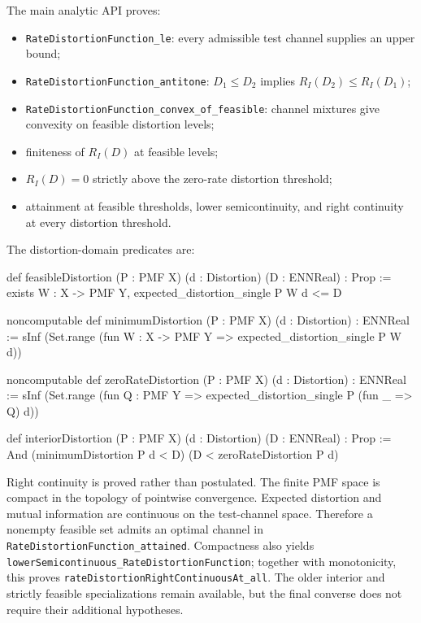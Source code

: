 \documentclass[11pt]{article}
\newcommand{\RD}{R_I}
\begin{document}
The main analytic API proves:
\begin{itemize}
  \item \texttt{Rate\allowbreak Distortion\allowbreak Function\_\allowbreak le}: every admissible test channel
        supplies an upper bound;
  \item \texttt{Rate\allowbreak Distortion\allowbreak Function\_\allowbreak antitone}: $D_1\le D_2$ implies
        $\RD(D_2)\le\RD(D_1)$;
  \item \texttt{Rate\allowbreak Distortion\allowbreak Function\_\allowbreak convex\_\allowbreak of\_\allowbreak feasible}: channel
        mixtures give convexity on feasible distortion levels;
  \item finiteness of $\RD(D)$ at feasible levels;
  \item $\RD(D)=0$ strictly above the zero-rate distortion threshold;
  \item attainment at feasible thresholds, lower semicontinuity, and right
        continuity at every distortion threshold.
\end{itemize}

The distortion-domain predicates are:
\begin{LeanCode}
def feasibleDistortion (P : PMF X) (d : Distortion) (D : ENNReal) : Prop :=
  exists W : X -> PMF Y, expected_distortion_single P W d <= D

noncomputable def minimumDistortion (P : PMF X) (d : Distortion) : ENNReal :=
  sInf (Set.range (fun W : X -> PMF Y =>
    expected_distortion_single P W d))

noncomputable def zeroRateDistortion (P : PMF X) (d : Distortion) : ENNReal :=
  sInf (Set.range (fun Q : PMF Y =>
    expected_distortion_single P (fun _ => Q) d))

def interiorDistortion (P : PMF X) (d : Distortion) (D : ENNReal) : Prop :=
  And (minimumDistortion P d < D) (D < zeroRateDistortion P d)
\end{LeanCode}

Right continuity is proved rather than postulated. The finite PMF space is
compact in the topology of pointwise convergence. Expected distortion and
mutual information are continuous on the test-channel space. Therefore a
nonempty feasible set admits an optimal channel in
\texttt{Rate\allowbreak Distortion\allowbreak Function\_\allowbreak attained}. Compactness also yields
\texttt{lower\allowbreak Semicontinuous\_\allowbreak Rate\allowbreak Distortion\allowbreak Function}; together with
monotonicity, this proves \texttt{rate\allowbreak Distortion\allowbreak Right\allowbreak Continuous\allowbreak At\_\allowbreak all}.
The older interior and strictly feasible specializations remain available,
but the final converse does not require their additional hypotheses.
\end{document}
